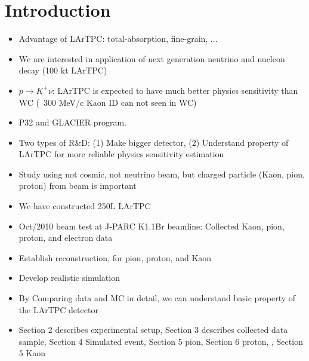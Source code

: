 \section{Introduction}
\begin{itemize}
\item Advantage of LArTPC: total-absorption, fine-grain, ...
\item We are interested in application of next generation neutrino and nucleon decay (100 kt LArTPC)
\item $p\to K^+\nu$: LArTPC is expected to have much better physics sensitivity than WC (~300 MeV/c Kaon ID can not seen in WC)
\item P32 and GLACIER program.
\item Two types of R\&D: (1) Make bigger detector,  (2) Understand property of LArTPC for more reliable physics sensitivity estimation
\item Study using not cosmic,  not neutrino beam, but charged particle (Kaon, pion, proton) from beam is important
\item We have constructed 250L LArTPC
\item Oct/2010 beam test at J-PARC K1.1Br beamline: Collected Kaon, pion, proton, and electron data
\item Establish reconstruction, for pion, proton, and Kaon
\item Develop realistic simulation
\item By Comparing data and MC in detail, we can understand basic property of the LArTPC detector
\item Section 2 describes experimental setup, Section 3 describes collected data sample, Section 4 Simulated event, Section 5 pion, Section 6 proton,   , Section 5 Kaon  
\end{itemize}
